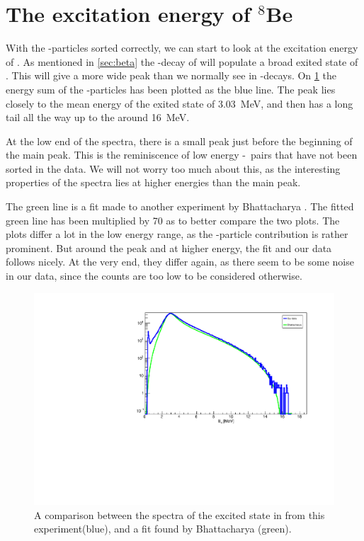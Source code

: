 \section{The excitation energy of $^8$Be}
With the \al-particles sorted correctly, we can start to look at the excitation energy of \ber. As mentioned in \cref{sec:beta} the \be-decay of \li will populate a broad exited state of \ber. This will give a more wide peak than we normally see in \al-decays. On \cref{fig:bata} the energy sum of the \al-particles has been plotted as the blue line. The peak lies closely to the mean energy of the exited state of \SI{3.03}{MeV}, and then has a long tail all the way up to the around \SI{16}{MeV}.

At the low end of the spectra, there is a small peak just before the beginning of the main peak. This is the reminiscence of low energy \be-\be\ pairs that have not been sorted in the data. We will not worry too much about this, as the interesting properties of the spectra lies at higher energies than the main peak.

The green line is a fit made to another experiment by Bhattacharya \cite{bata}. The fitted green line has been multiplied by 70 as to better compare the two plots. 
The plots differ a lot in the low energy range, as the \be-particle contribution is rather prominent. But around the peak and at higher energy, the fit and our data follows nicely. At the very end, they differ again, as there seem to be some noise in our data, since the counts are too low to be considered otherwise. 

\begin{figure}[h]
	\centering
	\includegraphics[width=\linewidth]{../figures/bataraCompare.pdf}
	\caption{A comparison between the spectra of the excited state in \ber from this experiment(blue), and a fit found by Bhattacharya \cite{bata} (green).}
	\label{fig:bata}
\end{figure}

